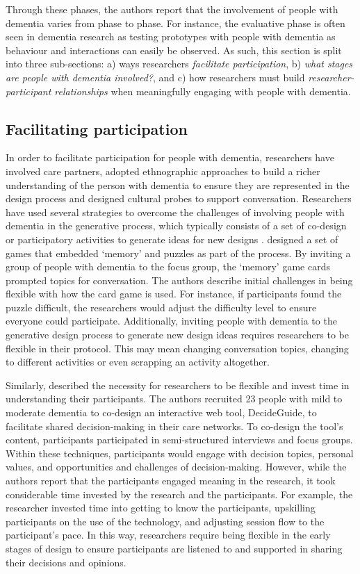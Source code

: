 Through these phases, the authors report that the involvement of people with dementia varies from phase to phase. For instance, the evaluative phase is often seen in dementia research as testing prototypes with people with dementia as behaviour and interactions can easily be observed. As such, this section is split into three sub-sections: a) ways researchers \textit{facilitate participation}, b) \textit{what stages are people with dementia involved?}, and c) how researchers must build \textit{researcher-participant relationships} when meaningfully engaging with people with dementia.

\subsection{Facilitating participation}
\label{BL:SupportParticipation}
In order to facilitate participation for people with dementia, researchers have involved care partners, adopted ethnographic approaches to build a richer understanding of the person with dementia to ensure they are represented in the design process and designed cultural probes to support conversation. Researchers have used several strategies to overcome the challenges of involving people with dementia in the generative process, which typically consists of a set of co-design or participatory activities to generate ideas for new designs \citep{suijkerbuijk_active_2019}. \cite{mayer2013lessons} designed a set of games that embedded `memory' and puzzles as part of the process. By inviting a group of people with dementia to the focus group, the `memory' game cards prompted topics for conversation. The authors describe initial challenges in being flexible with how the card game is used. For instance, if participants found the puzzle difficult, the researchers would adjust the difficulty level to ensure everyone could participate. Additionally, inviting people with dementia to the generative design process to generate new design ideas requires researchers to be flexible in their protocol. This may mean changing conversation topics, changing to different activities or even scrapping an activity altogether.

Similarly, \cite{span2015interactive} described the necessity for researchers to be flexible and invest time in understanding their participants. The authors recruited 23 people with mild to moderate dementia to co-design an interactive web tool, DecideGuide, to facilitate shared decision-making in their care networks. To co-design the tool's content, participants participated in semi-structured interviews and focus groups. Within these techniques, participants would engage with decision topics, personal values, and opportunities and challenges of decision-making. However, while the authors report that the participants engaged meaning in the research, it took considerable time invested by the research and the participants. For example, the researcher invested time into getting to know the participants, upskilling participants on the use of the technology, and adjusting session flow to the participant's pace. In this way, researchers require being flexible in the early stages of design to ensure participants are listened to and supported in sharing their decisions and opinions.

